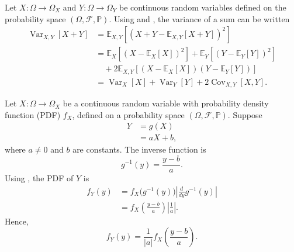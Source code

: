 \newpage
\begin{example}
	Let $X: \Omega \to \Omega_X$ and $Y: \Omega \to \Omega_Y$ be continuous random variables defined on the probability space $(\Omega, \mathcal{F}, \mathbb{P})$. Using  and , the variance of a sum can be written
	\begin{equation}
		\begin{split}
			\operatorname{Var}_{X,Y}[X+Y] &= \mathbb{E}_{X,Y}[(X+Y-\mathbb{E}_{X,Y}[X+Y])^2]\\
			&= \mathbb{E}_X[(X-\mathbb{E}_X[X])^2]+\mathbb{E}_Y[(Y-\mathbb{E}_Y[Y])^2]\\
			&\quad+2\mathbb{E}_{X,Y}[(X-\mathbb{E}_X[X])(Y-\mathbb{E}_Y[Y])]\\
			& = \operatorname{Var}_X[X]+\operatorname{Var}_Y[Y]+2\operatorname{Cov}_{X,Y}[X,Y].
		\end{split}
	\end{equation}
\end{example}

\begin{example}
	Let $X: \Omega \to \Omega_X$ be a continuous random variable with probability density function (PDF) $f_X$, defined on a probability space $(\Omega, \mathcal{F}, \mathbb{P})$. Suppose 
	\begin{equation}
		\begin{split}
			Y &= g(X)\\ 
			&= aX + b,
		\end{split}
	\end{equation}
	where $a \neq 0$ and $b$ are constants. The inverse function is
	\begin{equation}
		g^{-1}(y) = \frac{y - b}{a}.
	\end{equation}
	Using , the PDF of $Y$ is
	\begin{equation}
		\begin{split}
			f_Y(y) &= f_X\bigl(g^{-1}(y)\bigr) \left| \frac{d}{dy} g^{-1}(y) \right| \\
			&= f_X\left(\frac{y - b}{a}\right) \left| \frac{1}{a} \right|.
		\end{split}
	\end{equation}
	Hence,
	\begin{equation}
		f_Y(y) = \frac{1}{|a|} f_X\left(\frac{y - b}{a}\right).
	\end{equation}
\end{example}

